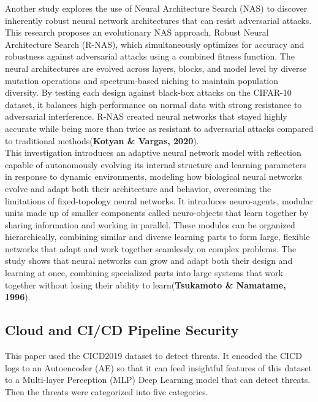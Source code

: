 Another study explores the use of Neural Architecture Search (NAS) to discover inherently robust neural network architectures that can resist adversarial attacks. This research proposes an evolutionary NAS approach, Robust Neural Architecture Search (R-NAS), which simultaneously optimizes for accuracy and robustness against adversarial attacks using a combined fitness function. The neural architectures are evolved across layers, blocks, and model level by diverse mutation operations and spectrum-based niching to maintain population diversity. By testing each design against black-box attacks on the CIFAR-10 dataset, it balances high performance on normal data with strong resistance to adversarial interference. R-NAS created neural networks that stayed highly accurate while being more than twice as resistant to adversarial attacks compared to traditional methods(\textbf{Kotyan \& Vargas, 2020})\cite{Kotyan}.\\

This investigation introduces an adaptive neural network model with reflection capable of autonomously evolving its internal structure and learning parameters in response to dynamic environments, modeling how biological neural networks evolve and adapt both their architecture and behavior, overcoming the limitations of fixed-topology neural networks. It introduces neuro-agents, modular units made up of smaller components called neuro-objects that learn together by sharing information and working in parallel. These modules can be organized hierarchically, combining similar and diverse learning parts to form large, flexible networks that adapt and work together seamlessly on complex problems. The study shows that neural networks can grow and adapt both their design and learning at once, combining specialized parts into large systems that work together without losing their ability to learn(\textbf{Tsukamoto \& Namatame, 1996})\cite{Tsukamoto}.\\

\subsection{Cloud and CI/CD Pipeline Security}
This paper used the CICD2019 dataset to detect threats. It encoded the CICD logs to an Autoencoder (AE) so that it can feed insightful features of this dataset to a Multi-layer Perception (MLP) Deep Learning model that can detect threats. Then the threats were categorized into five categories.\\

